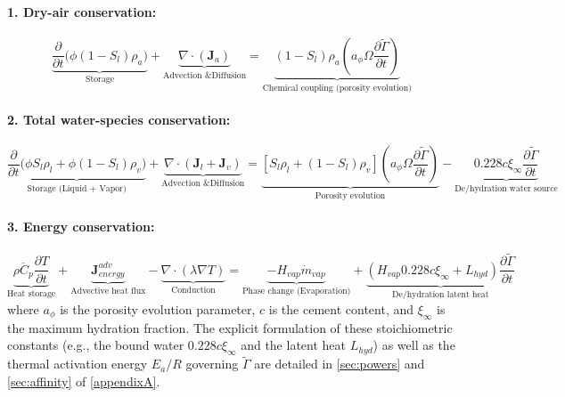 \paragraph{1. Dry-air conservation:}
\begin{equation}
    \underbrace{\frac{\partial}{\partial t}\big(\phi(1-S_l)\rho_a\big)}_{\text{Storage}} + \underbrace{\nabla \cdot (\mathbf{J}_a)}_{\text{Advection \& Diffusion}} = \underbrace{(1 - S_l)\rho_a \left(a_\phi \Omega \frac{\partial \tilde{\Gamma}}{\partial t}\right)}_{\text{Chemical coupling (porosity evolution)}}
    \label{eq:final_air}
\end{equation}

\paragraph{2. Total water-species conservation:}
\begin{equation}
    \underbrace{\frac{\partial}{\partial t}\big(\phi S_l \rho_l + \phi(1-S_l)\rho_v\big)}_{\text{Storage (Liquid + Vapor)}} + \underbrace{\nabla \cdot (\mathbf{J}_l + \mathbf{J}_v)}_{\text{Advection \& Diffusion}} = \underbrace{\left[ S_l\rho_l + (1-S_l)\rho_v \right] \left( a_\phi \Omega \frac{\partial \tilde{\Gamma}}{\partial t} \right)}_{\text{Porosity evolution}} - \underbrace{0.228 c \xi_\infty \frac{\partial \tilde{\Gamma}}{\partial t}}_{\text{De/hydration water source}}
    \label{eq:final_water}
\end{equation}

\paragraph{3. Energy conservation:}
\begin{equation}
    \underbrace{\overline{\rho C_p}\frac{\partial T}{\partial t}}_{\text{Heat storage}} + \underbrace{\mathbf{J}_{energy}^{adv}}_{\text{Advective heat flux}} - \underbrace{\nabla \cdot (\lambda \nabla T)}_{\text{Conduction}} = \underbrace{-H_{vap}\dot{m}_{vap}}_{\text{Phase change (Evaporation)}} + \underbrace{\left(H_{vap} 0.228 c \xi_\infty + L_{hyd}\right) \frac{\partial \tilde{\Gamma}}{\partial t}}_{\text{De/hydration latent heat}}
    \label{eq:final_energy}
\end{equation}
where $a_\phi$ is the porosity evolution parameter, $c$ is the cement content, and $\xi_\infty$ is the maximum hydration fraction. The explicit formulation of these stoichiometric constants (e.g., the bound water $0.228 c \xi_\infty$ and the latent heat $L_{hyd}$) as well as the thermal activation energy $E_a/R$ governing $\tilde{\Gamma}$ are detailed in \cref{sec:powers} and \cref{sec:affinity} of \cref{appendixA}.

